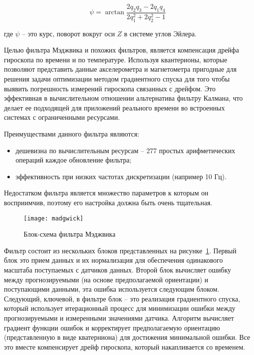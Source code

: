 \begin{equation}
    \label{eq:domain:QtoPsi}
    \psi = \arctan{\frac{2q_{2}q_{3}-2q_{1}q_{4}}{2q_{1}^{2} + 2q_{2}^{2}-1}}
    \end{equation}
    \begin{explanationx}
        \item[где] $\psi$  -- это курс, поворот вокруг оси $Z$ в системе углов Эйлера.
        \end{explanationx}
        
Целью фильтра Мэджвика и похожих фильтров, является компенсация дрейфа гироскопа по времени и по температуре.
Используя квантерионы, которые позволяют представить данные акселерометра и магнетометра пригодные для решения задачи оптимизации 
методом градиентного спуска для того чтобы выявить погрешность измерений гироскопа связанных с дрейфом. Это эффективная в 
вычислительном отношении альтернатива фильтру Калмана, что делает ее подходящей для приложений реального времени во встроенных 
системах с ограниченными ресурсами. 

Преимуществами данного фильтра являются:

\begin{itemize}
    \item дешевизна по вычислительным ресурсам -- 277 простых арифметических операций каждое обновление фильтра;
    \item эффективность при низких частотах дискретизации (например 10 Гц).
\end{itemize}

Недостатком фильтра является множество параметров к которым он восприимчив, поэтому его настройка должна быть очень тщательная.

\begin{figure}[ht]
    \centering
    \texttt{[image: madgwick]}
    \caption{Блок-схема фильтра Мэджвика}
    \label{pic::domain::madgwick}
\end{figure}


Фильтр состоит из нескольких блоков представленных на рисунке~\ref{pic::domain::madgwick}.
Первый блок это прием данных и их нормализация для обеспечения одинакового 
масштаба поступаемых с датчиков данных.
Второй блок вычисляет ошибку между прогнозируемыми (на основе предполагаемой ориентации) и поступающими данными, 
эта ошибка используется следующим блоком.
Следующий, ключевой, в фильтре блок -- это реализация градиентного спуска, который 
использует итерационный процесс для минимизации ошибки между прогнозируемыми и 
измеренными значениями датчика. Алгоритм вычисляет градиент функции ошибок и корректирует
предполагаемую ориентацию (представленную в виде кватерниона) для достижения минимальной ошибки.
Все это вместе компенсирует дрейф гироскопа, который накапливается со временем.

